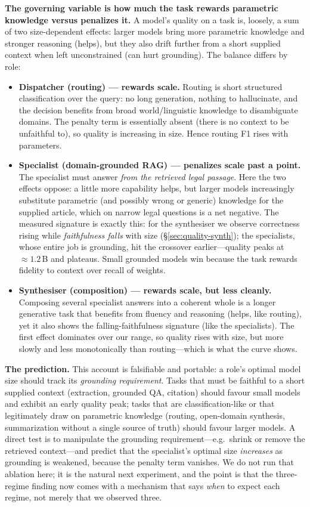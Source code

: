 \documentclass[11pt]{article}
\begin{document}
\textbf{The governing variable is how much the task rewards parametric knowledge
versus penalizes it.} A model's quality on a task is, loosely, a sum of two
size-dependent effects: larger models bring more parametric knowledge and stronger
reasoning (helps), but they also drift further from a short supplied context when
left unconstrained (can hurt grounding). The balance differs by role:

\begin{itemize}\itemsep2pt
\item \textbf{Dispatcher (routing) --- rewards scale.} Routing is short structured
classification over the query: no long generation, nothing to hallucinate, and the
decision benefits from broad world/linguistic knowledge to disambiguate domains.
The penalty term is essentially absent (there is no context to be unfaithful to),
so quality is increasing in size. Hence routing F1 rises with parameters.
\item \textbf{Specialist (domain-grounded RAG) --- penalizes scale past a point.}
The specialist must answer \emph{from the retrieved legal passage}. Here the two
effects oppose: a little more capability helps, but larger models increasingly
substitute parametric (and possibly wrong or generic) knowledge for the supplied
article, which on narrow legal questions is a net negative. The measured signature
is exactly this: for the synthesiser we observe correctness rising while
\emph{faithfulness falls} with size (§\ref{sec:quality-synth}); the specialists,
whose entire job is grounding, hit the crossover earlier---quality peaks at
$\approx1.2$\,B and plateaus. Small grounded models win because the task rewards
fidelity to context over recall of weights.
\item \textbf{Synthesiser (composition) --- rewards scale, but less cleanly.}
Composing several specialist answers into a coherent whole is a longer generative
task that benefits from fluency and reasoning (helps, like routing), yet it also
shows the falling-faithfulness signature (like the specialists). The first effect
dominates over our range, so quality rises with size, but more slowly and less
monotonically than routing---which is what the curve shows.
\end{itemize}

\textbf{The prediction.} This account is falsifiable and portable: a role's optimal
model size should track its \emph{grounding requirement}. Tasks that must be
faithful to a short supplied context (extraction, grounded QA, citation) should
favour small models and exhibit an early quality peak; tasks that are
classification-like or that legitimately draw on parametric knowledge (routing,
open-domain synthesis, summarization without a single source of truth) should favour
larger models. A direct test is to manipulate the grounding requirement---e.g.\
shrink or remove the retrieved context---and predict that the specialist's optimal
size \emph{increases} as grounding is weakened, because the penalty term vanishes.
We do not run that ablation here; it is the natural next experiment, and the point
is that the three-regime finding now comes with a mechanism that says \emph{when} to
expect each regime, not merely that we observed three.
\end{document}
